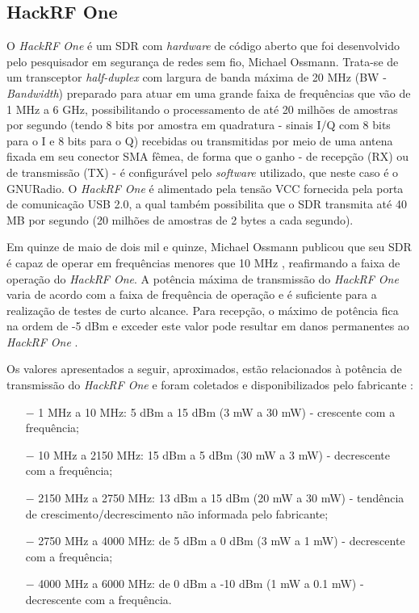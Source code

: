 \documentclass[
  12pt,				%
  openright,			%
  twoside,			%
  a4paper,			%
  english,			%
  french,				%
  spanish,			%
  brazil,				%
  ]{abntex2}
\begin{document}
\subsection*{HackRF One}


O \textit{HackRF One} é um SDR com \textit{hardware} de código aberto que foi desenvolvido pelo pesquisador em segurança de redes sem fio, Michael Ossmann. Trata-se de um transceptor \textit{half-duplex}
com largura de banda máxima de 20 MHz (BW - \textit{Bandwidth}) preparado para atuar em uma grande faixa de frequências que vão de 1 MHz a 6 GHz, possibilitando o processamento de até 20 milhões de amostras por
segundo (tendo 8 bits por amostra em quadratura - sinais I/Q com 8 bits para o I e 8 bits para o Q) recebidas ou transmitidas por meio de uma antena fixada em seu conector SMA fêmea, de
forma que o ganho - de recepção (RX) ou de transmissão (TX) - é configurável pelo \textit{software} utilizado, que neste caso é o GNURadio. O \textit{HackRF One} é alimentado pela tensão VCC fornecida
pela porta de comunicação USB 2.0, a qual também possibilita que o SDR transmita até 40 MB por segundo (20 milhões de amostras de 2 bytes a cada segundo).

Em quinze de maio de dois mil e quinze, Michael Ossmann publicou que seu SDR é capaz de operar em frequências menores que 10 MHz \cite{HACKRF-1mhz}, reafirmando a faixa de operação do \textit{HackRF One}.
A potência máxima de transmissão do \textit{HackRF One} varia de acordo com a faixa de frequência de operação e é suficiente para a realização de testes de curto alcance. Para recepção, o máximo de
potência fica na ordem de -5 dBm e exceder este valor pode resultar em danos permanentes ao \textit{HackRF One} \cite{HACKRF-hardware-receive-power}.

Os valores apresentados a seguir, aproximados, estão relacionados à potência de transmissão do \textit{HackRF One} e foram coletados e disponibilizados pelo fabricante \cite{HACKRF-hardware-transmit-power}:

\begin{itemize}
  \item[$-$] 1 MHz a 10 MHz: 5 dBm a 15 dBm (3 mW a 30 mW) - crescente com a frequência;
  \item[$-$] 10 MHz a 2150 MHz: 15 dBm a 5 dBm (30 mW a 3 mW) - decrescente com a frequência;
  \item[$-$] 2150 MHz a 2750 MHz: 13 dBm a 15 dBm (20 mW a 30 mW) - tendência de crescimento/decrescimento não informada pelo fabricante;
  \item[$-$] 2750 MHz a 4000 MHz: de 5 dBm a 0 dBm (3 mW a 1 mW) - decrescente com a frequência;
  \item[$-$] 4000 MHz a 6000 MHz: de 0 dBm a -10 dBm (1 mW a 0.1 mW) - decrescente com a frequência.
\end{itemize}
\end{document}
